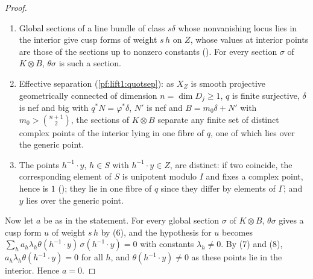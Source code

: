 \begin{proof}
\begin{enumerate}[label=(\arabic*)]
  space and the nefness of the line bundles of weights with nonnegative gaps
  (,
  ); $\delta$ is big
  (, whose proof uses
  \cref{pf:lift1:hodge-thm}).
\item Global sections of a line bundle of class $s\delta$ whose nonvanishing locus lies in the interior
  give cusp forms of weight $s\,h$ on $Z$, whose values at interior points are those of the sections
  up to nonzero constants
  (). For every section
  $\sigma$ of $K\otimes B$, $\theta\sigma$ is such a section.
\item Effective separation (\cref{pf:lift1:quotsep}): as $X_Z$ is smooth projective geometrically
  connected of dimension $n=\dim D_j\ge1$, $q$ is finite surjective, $\delta$ is nef and big with
  $q^*N=\varphi^*\delta$, $N'$ is nef and $B=m_0\delta+N'$ with $m_0>\binom{n+1}2$, the sections of $K\otimes B$
  separate any finite set of distinct complex points of the interior lying in one fibre of $q$, one of
  which lies over the generic point.
\item The points $h^{-1}\cdot y$, $h\in S$ with $h^{-1}\cdot y\in Z$, are distinct: if two coincide, the
  corresponding element of $S$ is unipotent modulo $I$ and fixes a complex point, hence is $1$
  (); they lie in one
  fibre of $q$ since they differ by elements of $\Gamma$; and $y$ lies over the generic point.
\end{enumerate}
Now let $a$ be as in the statement. For every global section $\sigma$ of $K\otimes B$, $\theta\sigma$ gives
a cusp form $u$ of weight $s\,h$ by (6), and the hypothesis for $u$ becomes
$\sum_ha_h\lambda_h\theta(h^{-1}\cdot y)\,\sigma(h^{-1}\cdot y)=0$ with constants $\lambda_h\ne0$. By (7) and
(8), $a_h\lambda_h\theta(h^{-1}\cdot y)=0$ for all $h$, and $\theta(h^{-1}\cdot y)\ne0$ as these points lie
in the interior. Hence $a=0$.
\end{proof}

